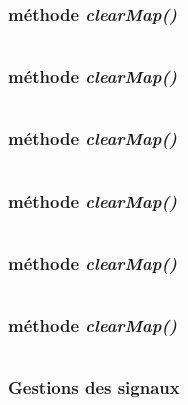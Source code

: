 \documentclass[11pt]{article}
\begin{document}
\begin{appendices}
\subsubsection{méthode \textit{clearMap()}}
\begin{lstlisting}[language=JavaScript]

\end{lstlisting} 
\subsubsection{méthode \textit{clearMap()}}
\begin{lstlisting}[language=JavaScript]

\end{lstlisting} 
\subsubsection{méthode \textit{clearMap()}}
\begin{lstlisting}[language=JavaScript]

\end{lstlisting} 
\subsubsection{méthode \textit{clearMap()}}
\begin{lstlisting}[language=JavaScript]

\end{lstlisting} 
\subsubsection{méthode \textit{clearMap()}}
\begin{lstlisting}[language=JavaScript]

\end{lstlisting} 
\subsubsection{méthode \textit{clearMap()}}
\begin{lstlisting}[language=JavaScript]

\end{lstlisting} 
\subsubsection{Gestions des signaux}
\begin{lstlisting}[language=JavaScript]


\end{lstlisting}
\end{appendices}
\end{document}
